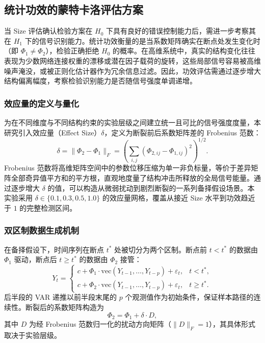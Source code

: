 \subsection{统计功效的蒙特卡洛评估方案}\label{subsec:power}

当 Size 评估确认检验方案在 $H_0$ 下具有良好的错误控制能力后，需进一步考察其在 $H_1$ 下的信号识别能力。统计功效衡量的是当系数矩阵确实在断点处发生变化时（即 $\Phi_1 \neq \Phi_2$），检验正确拒绝 $H_0$ 的概率。在高维系统中，真实的结构变化往往表现为少数网络连接权重的漂移或潜在因子载荷的旋转，这些局部信号容易被高维噪声淹没，或被正则化估计器作为冗余信息过滤。因此，功效评估需通过逐步增大结构偏离幅度，考察检验识别能力是否随信号强度单调递增。

\subsubsection{效应量的定义与量化}

为在不同维度与不同结构约束的实验层级之间建立统一且可比的信号强度度量，本研究引入效应量（Effect Size）$\delta$，定义为断裂前后系数矩阵差的 Frobenius 范数：
\begin{equation}\label{eq:effect-size}
    \delta = \|\Phi_2 - \Phi_1\|_F = \left(\sum_{i,j} (\Phi_{2,ij} - \Phi_{1,ij})^2\right)^{1/2}.
\end{equation}
Frobenius 范数将高维矩阵空间中的参数位移压缩为单一非负标量，等价于差异矩阵全部奇异值平方和的平方根，直观地度量了结构冲击所释放的全局信号能量。通过逐步增大 $\delta$ 的值，可以构造从微弱扰动到剧烈断裂的一系列备择假设场景。本实验采用 $\delta \in \{0.1, 0.3, 0.5, 1.0\}$ 的效应量网格，覆盖从接近 Size 水平到功效趋近于 $1$ 的完整检测区间。

\subsubsection{双区制数据生成机制}

在备择假设下，时间序列在断点 $t^*$ 处被切分为两个区制。断点前 $t < t^*$ 的数据由 $\Phi_1$ 驱动，断点后 $t \geq t^*$ 的数据由 $\Phi_2$ 接管：
\begin{equation}\label{eq:two-regime}
    Y_t = \begin{cases}
        c + \Phi_1 \cdot \mathrm{vec}(Y_{t-1}, \ldots, Y_{t-p}) + \varepsilon_t, & t < t^*, \\
        c + \Phi_2 \cdot \mathrm{vec}(Y_{t-1}, \ldots, Y_{t-p}) + \varepsilon_t, & t \geq t^*.
    \end{cases}
\end{equation}
后半段的 VAR 递推以前半段末尾的 $p$ 个观测值作为初始条件，保证样本路径的连续性。断裂后的系数矩阵构造为
\begin{equation}\label{eq:phi2-construct}
    \Phi_2 = \Phi_1 + \delta \cdot D,
\end{equation}
其中 $D$ 为经 Frobenius 范数归一化的扰动方向矩阵（$\|D\|_F = 1$），其具体形式取决于实验层级。

